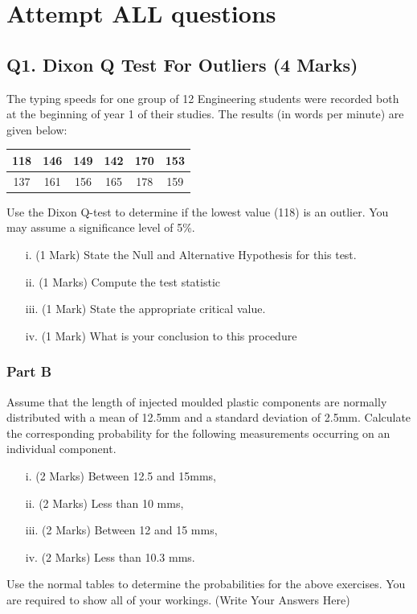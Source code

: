 \documentclass[a4paper,12pt]{article}
\begin{document}
\section*{Attempt ALL questions}

\subsection*{Q1. Dixon Q Test For Outliers (4 Marks)}

The typing speeds for one group of 12 Engineering students were recorded both at the beginning of year 1 of their studies. The results (in words per minute) are given below:

\begin{center}
	\begin{tabular}{|c|c|c|c|c|c|}
		\hline
		118 & 146 & 149 & 142 & 170& 153\\ \hline
		137 & 161 & 156& 165&  178& 159
		\\ \hline
	\end{tabular}
\end{center}
Use the Dixon Q-test to determine if the lowest value (118) is an outlier. You may assume a significance level of 5\%.
\begin{itemize}
	\item[i.](1 Mark)	State the Null and Alternative Hypothesis for this test.
	\item[ii.](1 Marks) Compute the test statistic
	\item[iii.](1 Mark) State the appropriate critical value.
	\item[iv.](1 Mark) What is your conclusion to this procedure
\end{itemize}



\subsubsection*{Part B} %
Assume that the length of injected moulded plastic components are normally distributed with a mean of 12.5mm and a standard deviation of 2.5mm.  Calculate the corresponding probability for the following measurements occurring on an individual component.

\begin{itemize}
	\item [i.](2 Marks)	Between 12.5 and 15mms,
	\item [ii.](2 Marks) Less than 10 mms,
	\item [iii.](2 Marks) Between 12 and 15 mms,
	\item [iv.](2 Marks) Less than 10.3 mms.
\end{itemize}
\noindent Use the normal tables to determine the probabilities for the above exercises. You are required to show all of your workings.
\newpage
(Write Your Answers Here)
\newpage
\vspace{0.25cm}
\end{document}
